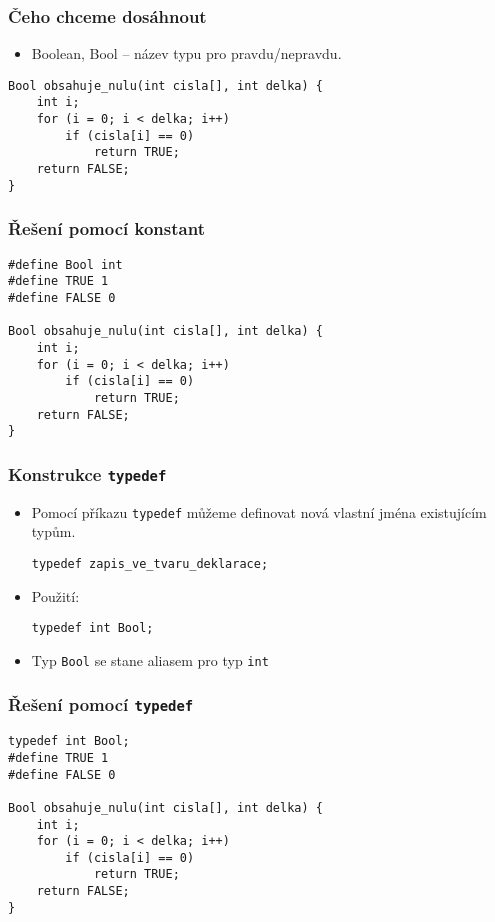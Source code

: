 \documentclass{beamer}
\newenvironment{itemizex}%
  {\large \begin{itemize}%
    \setlength{\itemsep}{8pt}%
    \setlength{\parskip}{8pt}}%
  {\end{itemize}}
\begin{document}
\begin{frame}[t,fragile]\frametitle{Čeho chceme dosáhnout} 
    \begin{itemizex}
        \item Boolean, Bool -- název typu pro pravdu/nepravdu. 
    \end{itemizex}
        \begin{verbatim} 
Bool obsahuje_nulu(int cisla[], int delka) {
    int i;
    for (i = 0; i < delka; i++)
        if (cisla[i] == 0) 
            return TRUE;
    return FALSE;
}
        \end{verbatim}
\end{frame}

\begin{frame}[t,fragile]\frametitle{Řešení pomocí konstant} 
\begin{verbatim} 
#define Bool int
#define TRUE 1
#define FALSE 0

Bool obsahuje_nulu(int cisla[], int delka) {
    int i;
    for (i = 0; i < delka; i++)
        if (cisla[i] == 0) 
            return TRUE;
    return FALSE;
}
\end{verbatim}
\end{frame}


\begin{frame}[t,fragile]\frametitle{Konstrukce \texttt{typedef}} 
    \begin{itemizex}
        \item Pomocí příkazu \texttt{typedef} můžeme definovat nová vlastní jména existujícím typům.
        \begin{verbatim} 
typedef zapis_ve_tvaru_deklarace;
        \end{verbatim}
        \item Použití:
        \begin{verbatim} 
typedef int Bool;
        \end{verbatim}
        \item Typ \texttt{Bool} se stane aliasem pro typ \texttt{int}
    \end{itemizex}
\end{frame}


\begin{frame}[t,fragile]\frametitle{Řešení pomocí \texttt{typedef}} 
\begin{verbatim} 
typedef int Bool;
#define TRUE 1
#define FALSE 0

Bool obsahuje_nulu(int cisla[], int delka) {
    int i;
    for (i = 0; i < delka; i++)
        if (cisla[i] == 0) 
            return TRUE;
    return FALSE;
}
\end{verbatim}
\end{frame}
\end{document}
